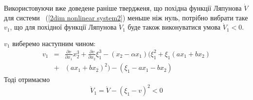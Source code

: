 \documentclass{article}
\begin{document}
Використовуючи вже доведене раніше твердженя, що похідна функції Ляпунова $\dot V$ для системи
 ~(\ref{2dim nonlinear system2})  меньше ніж нуль, потрібно вибрати таке $v_1$, що для похідної функції
Ляпунова $\dot V_1$ буде також виконуватися умова $\dot V_1 < 0$.

$v_1$ виберемо наступним чином:
\begin{eqnarray}
    v_1 &=& \frac{\partial v}{\partial x_1}x_{2}^3 + \frac{\partial v}{\partial x_2}\xi_{1}^3
    - (x_2 -\alpha x_1) \Big(\xi_1^2 + \xi_1(ax_1 + bx_2) \nonumber \\ 
    &+& (ax_1+bx_2)^2 \Big) -(\xi_1 - ax_1-bx_2)
\end{eqnarray}
Тоді отримаємо
\begin{equation}
    \dot V_1 = \dot V - (\xi_1 - v)^2<0
\end{equation}
\end{document}
